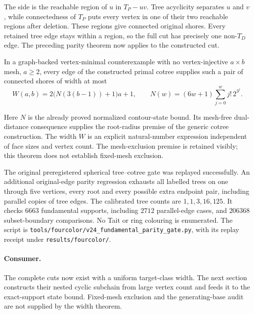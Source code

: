 The side is the reachable region of $u$ in $T_P-uv$.  Tree acyclicity
separates $u$ and $v$, while connectedness of $T_P$ puts every vertex in
one of their two reachable regions after deletion.  These regions give
connected original shores.  Every retained tree edge stays within a
region, so the full cut has precisely one non-$T_D$ edge.  The preceding
parity theorem now applies to the constructed cut.

\begin{theorem}
In a graph-backed vertex-minimal counterexample with no vertex-injective
$a\times b$ mesh, $a\geq2$, every edge of the constructed primal cotree
supplies such a pair of connected shores of width at most
\[
 W(a,b)=2\bigl(N(3(b-1))+1\bigr)a+1,
 \qquad
 N(w)=(6w+1)\sum_{j=0}^{w}j!\,2^{3^j}.
\]
\end{theorem}

Here $N$ is the already proved normalized contour-state bound.  Its
mesh-free dual-distance consequence supplies the root-radius premise of
the generic cotree construction.  The width $W$ is an explicit
natural-number expression independent of face sizes and vertex count.
The mesh-exclusion premise is retained visibly; this theorem does not
establish fixed-mesh exclusion.

The original preregistered spherical tree--cotree gate was replayed
successfully.  An additional original-edge parity regression exhausts
all labelled trees on one through five vertices, every root and every
possible extra endpoint pair, including parallel copies of tree edges.
The calibrated tree counts are $1,1,3,16,125$.  It checks $6663$
fundamental supports, including $2712$ parallel-edge cases, and $206368$
subset-boundary comparisons.  No Tait or ring colouring is enumerated.
The script is \texttt{tools/fourcolor/v24\_fundamental\_parity\_gate.py},
with its replay receipt under \texttt{results/fourcolor/}.

\paragraph{Consumer.}
The complete cuts now exist with a uniform target-class width.  The next
section constructs their nested cyclic subchain from large vertex count
and feeds it to the exact-support state bound.  Fixed-mesh exclusion and
the generating-base audit are not supplied by the width theorem.

